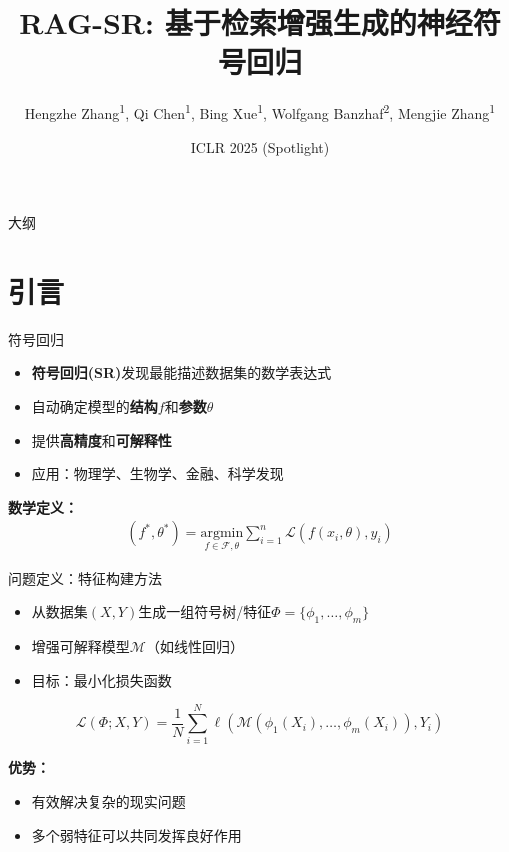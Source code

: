 \documentclass[aspectratio=1610]{beamer}
\title[RAG-SR]{RAG-SR: 基于检索增强生成的神经符号回归}
\author[张等]{Hengzhe Zhang\textsuperscript{1}, Qi Chen\textsuperscript{1}, Bing Xue\textsuperscript{1}, Wolfgang Banzhaf\textsuperscript{2}, Mengjie Zhang\textsuperscript{1}}
\institute[惠灵顿维多利亚大学 & 密歇根州立大学]{
    \textsuperscript{1} 惠灵顿维多利亚大学工程与计算机科学学院
    \textsuperscript{2} 密歇根州立大学计算机科学与工程系
}
\date{ICLR 2025 (Spotlight)}
\begin{document}
    \begin{frame}
        \titlepage
    \end{frame}


    \begin{frame}{大纲}
        \tableofcontents
    \end{frame}


    \section{引言}

    \begin{frame}{符号回归}
        \begin{itemize}
            \item \textbf{符号回归(SR)}发现最能描述数据集的数学表达式
            \item 自动确定模型的\textbf{结构}$f$和\textbf{参数}$\theta$
            \item 提供\textbf{高精度}和\textbf{可解释性}
            \item 应用：物理学、生物学、金融、科学发现
        \end{itemize}

        \vspace{0.3cm}

        \textbf{数学定义：}
        \begin{align}
        (f^*, \theta^*)
            = \underset{f \in \mathcal{F}, \theta}{\text{argmin}} \sum_{i=1}^n \mathcal{L}(f(x_i, \theta), y_i)
        \end{align}
    \end{frame}

    \begin{frame}{问题定义：特征构建方法}
        \begin{itemize}
            \item 从数据集$(X, Y)$生成一组符号树/特征$\Phi = \{\phi_1, \ldots, \phi_m\}$
            \item 增强可解释模型$\mathcal{M}$（如线性回归）
            \item 目标：最小化损失函数
        \end{itemize}

        \begin{equation}
            \mathcal{L}(\Phi; X, Y) = \frac{1}{N} \sum_{i=1}^{N} \ell\left(\mathcal{M}\left(\phi_1(X_i), \ldots, \phi_m(X_i)\right), Y_i\right)
        \end{equation}

        \vspace{0.3cm}
        \textbf{优势：}
        \begin{itemize}
            \item 有效解决复杂的现实问题
            \item 多个弱特征可以共同发挥良好作用
        \end{itemize}
    \end{frame}
\end{document}

